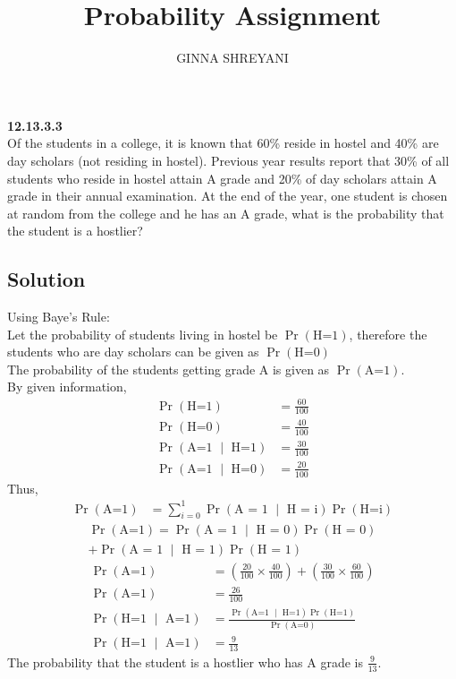 \documentclass[10pt,twocolumn]{article}
\title{
Probability Assignment
}
\author{GINNA SHREYANI}
\date{}
\providecommand{\pr}[1]{\ensuremath{\Pr\left(#1\right)}}
\begin{document}
\maketitle

\textbf{12.13.3.3}\\
Of the students in a college, it is known that 60\% reside in hostel and 40\% are day scholars (not residing in hostel). Previous year results report that 30\% of all students who reside in hostel attain A grade and 20\% of day scholars attain A grade in their annual examination. At the end of the year, one student is chosen at random from the college and he has an A grade, what is the probability that the student is a hostlier?
\subsection*{Solution}
Using Baye's Rule:\\
Let the probability of students living in hostel be $\pr{\text{H=1}}$, therefore the students who are day scholars can be given as $\pr{\text{H=0}}$\\
The probability of the students getting grade A is given as $\pr{\text{A=1}}$.\\
By given information,
\begin{align}
	\pr{\text{H=1}} &= \frac{60}{100}\\
	\pr{\text{H=0}} &= \frac{40}{100}\\
	\pr{\text{A=1 $\mid$ H=1}} &= \frac{30}{100}\\
	\pr{\text{A=1 $\mid$ H=0}} &= \frac{20}{100}
\end{align}
Thus,
\begin{align}
	\pr{\text{A=1}} &= \sum_{i=0}^1 \pr{\text{A = 1 $\mid$ H = i}}\pr{\text{H=i}}
\end{align}
\begin{multline}
	\pr{\text{A=1}} = \pr{\text{A = 1 $\mid$ H = 0}}\pr{\text{H = 0}}\\
	+\pr{\text{A = 1 $\mid$ H = 1}}\pr{\text{H = 1}}
\end{multline}
\begin{align}
	\pr{\text{A=1}} &= \left(\frac{20}{100} \times \frac{40}{100}\right)+\left(\frac{30}{100} \times \frac{60}{100}\right)\\
	\pr{\text{A=1}} &= \frac{26}{100}\\
	\pr{\text{H=1 $\mid$ A=1}} &= \frac{\pr{\text{A=1 $\mid$ H=1}}\pr{\text{H=1}}}{\pr{\text{A=0}}}\\
	\pr{\text{H=1 $\mid$ A=1}} &= \frac{9}{13}
\end{align}
The probability that the student is a hostlier who has A grade is $\frac{9}{13}$.
\end{document}
